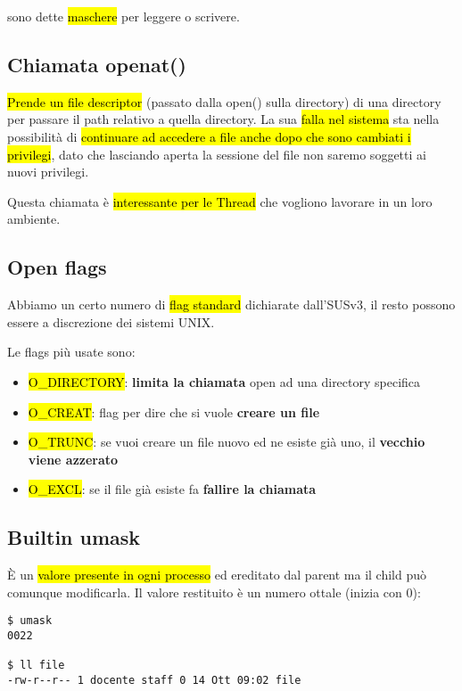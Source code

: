 sono dette \hl{maschere} per leggere o scrivere.


\subsection{Chiamata openat()}

\hl{Prende un file descriptor} (passato dalla open() sulla directory) di una directory per passare il path relativo a quella directory. La sua \hl{falla nel sistema} sta nella possibilità di \hl{continuare ad accedere a file anche dopo che sono cambiati i privilegi}, dato che lasciando aperta la sessione del file non saremo soggetti ai nuovi privilegi.

Questa chiamata è \hl{interessante per le Thread} che vogliono lavorare in un loro ambiente.


\subsection{Open flags}

Abbiamo un certo numero di \hl{flag standard} dichiarate dall'SUSv3, il resto possono essere a discrezione dei sistemi UNIX.

Le flags più usate sono:

\begin{itemize}
	\item \hl{O\_DIRECTORY}: \textbf{limita la chiamata} open ad una directory specifica

	\item \hl{O\_CREAT}: flag per dire che si vuole \textbf{creare un file}

	\item \hl{O\_TRUNC}: se vuoi creare un file nuovo ed ne esiste già uno, il \textbf{vecchio viene azzerato}

	\item \hl{O\_EXCL}: se il file già esiste fa \textbf{fallire la chiamata}
\end{itemize}


\subsection{Builtin umask}

È un \hl{valore presente in ogni processo} ed ereditato dal parent ma il child può comunque modificarla. Il valore restituito è un numero ottale (inizia con 0):

\begin{lstlisting}
$ umask
0022

$ ll file
-rw-r--r-- 1 docente staff 0 14 Ott 09:02 file
\end{lstlisting}

